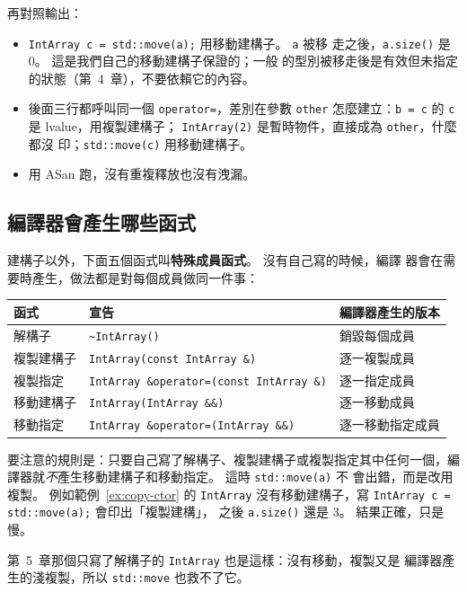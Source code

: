 再對照輸出：

\begin{itemize}
\item \texttt{IntArray c = std::move(a);} 用移動建構子。 \texttt{a} 被移
走之後，\texttt{a.size()} 是 $0$。 這是我們自己的移動建構子保證的；一般
的型別被移走後是有效但未指定的狀態（第~4~章），不要依賴它的內容。
\item 後面三行都呼叫同一個 \texttt{operator=}，差別在參數 \texttt{other}
怎麼建立：\texttt{b = c} 的 \texttt{c} 是 lvalue，用複製建構子；
\texttt{IntArray(2)} 是暫時物件，直接成為 \texttt{other}，什麼都沒
印；\texttt{std::move(c)} 用移動建構子。
\item 用 ASan 跑，沒有重複釋放也沒有洩漏。
\end{itemize}

\subsection{編譯器會產生哪些函式}

建構子以外，下面五個函式叫\textbf{特殊成員函式}。 沒有自己寫的時候，編譯
器會在需要時產生，做法都是對每個成員做同一件事：

\begin{center}
\begin{tabular}{lll}
\toprule
函式 & 宣告 & 編譯器產生的版本 \\
\midrule
解構子 & \texttt{\textasciitilde IntArray()} & 銷毀每個成員 \\
複製建構子 & \texttt{IntArray(const IntArray \&)} & 逐一複製成員 \\
複製指定 & \texttt{IntArray \&operator=(const IntArray \&)} & 逐一指定成員 \\
移動建構子 & \texttt{IntArray(IntArray \&\&)} & 逐一移動成員 \\
移動指定 & \texttt{IntArray \&operator=(IntArray \&\&)} & 逐一移動指定成員 \\
\bottomrule
\end{tabular}
\end{center}

要注意的規則是：只要自己寫了解構子、複製建構子或複製指定其中任何一個，編
譯器就\emph{不}產生移動建構子和移動指定。 這時 \texttt{std::move(a)} 不
會出錯，而是改用複製。 例如範例~\ref{ex:copy-ctor} 的 \texttt{IntArray}
沒有移動建構子，寫 \texttt{IntArray c = std::move(a);} 會印出「複製建構」，
之後 \texttt{a.size()} 還是 $3$。 結果正確，只是慢。

第~5~章那個只寫了解構子的 \texttt{IntArray} 也是這樣：沒有移動，複製又是
編譯器產生的淺複製，所以 \texttt{std::move} 也救不了它。

